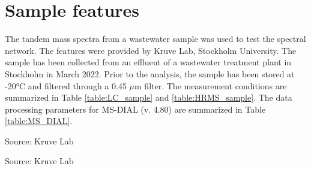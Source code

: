 


\clearpage
{}
\section{Sample \tMS{} features}
\label{appendix:sample_details}

The tandem mass spectra from a wastewater sample was used to test the spectral network. The \tMS{} features were provided by Kruve Lab, Stockholm University. The sample has been collected from an effluent of a wastewater treatment plant in Stockholm in March 2022. Prior to the analysis, the sample has been stored at -20°C and filtered through a 0.45 \(\mu\)m filter. The measurement conditions are summarized in Table \ref{table:LC_sample} and \ref{table:HRMS_sample}. The data processing parameters for MS-DIAL (v. 4.80) are summarized in Table \ref{table:MS_DIAL}.

\begin{table}[htbp]
\centering
\footnotesize
\label{table:LC_sample}
\caption*{Source: Kruve Lab}

\end{table}


\begin{table}[htbp]
\centering
\footnotesize
\label{table:HRMS_sample}
\caption*{Source: Kruve Lab}
\end{table}



